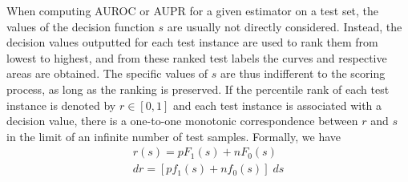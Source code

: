 When computing AUROC or AUPR for a given estimator on a test set, the values of the decision function $s$ are usually not directly considered. Instead, the decision values outputted for each test instance are used to rank them from lowest to highest, and from these ranked test labels the curves and respective areas are obtained. The specific values of $s$ are thus indifferent to the scoring process, as long as the ranking is preserved. If the percentile rank of each test instance is denoted by $r \in [0, 1]$ and each test instance is associated with a decision value, there is a one-to-one monotonic correspondence between $r$ and $s$ in the limit of an infinite number of test samples.
Formally, we have
%
%
\begin{gather}
    r(s) = pF_1(s) + nF_0(s)\\
    dr = [pf_1(s) + nf_0(s)] \; ds
\end{gather}

